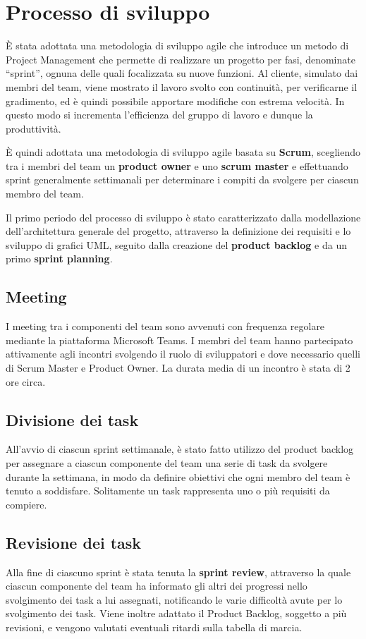 \section{Processo di sviluppo}
È stata adottata una metodologia di sviluppo agile che introduce un metodo di Project Management che permette di realizzare un progetto per fasi, denominate “sprint”, ognuna delle quali focalizzata su nuove funzioni. Al cliente, simulato dai membri del team, viene mostrato il lavoro svolto con continuità, per verificarne il gradimento, ed è quindi possibile apportare modifiche con estrema velocità. In questo modo si incrementa l’efficienza del gruppo di lavoro e dunque la produttività.

È quindi adottata una metodologia di sviluppo agile basata su \textbf{Scrum}, scegliendo tra i membri del team un \textbf{product owner} e uno \textbf{scrum master} e effettuando sprint generalmente settimanali per determinare i compiti da svolgere per ciascun membro del team.

Il primo periodo del processo di sviluppo è stato caratterizzato dalla modellazione dell'architettura generale del progetto, attraverso la definizione dei requisiti e lo sviluppo di grafici UML, seguito dalla creazione del \textbf{product backlog} e da un primo \textbf{sprint planning}.

\subsection{Meeting}
I meeting tra i componenti del team sono avvenuti con frequenza regolare mediante la piattaforma Microsoft Teams. 
I membri del team hanno partecipato attivamente agli incontri svolgendo il ruolo di sviluppatori e dove necessario quelli di Scrum Master e Product Owner. La durata media di un incontro è stata di 2 ore circa.

\subsection{Divisione dei task}
All'avvio di ciascun sprint settimanale, è stato fatto utilizzo del product backlog per assegnare a ciascun componente del team una serie di task da svolgere durante la settimana, in modo da definire obiettivi che ogni membro del team è tenuto a soddisfare. Solitamente un task rappresenta uno o più requisiti da compiere.

\subsection{Revisione dei task}
Alla fine di ciascuno sprint è stata tenuta la \textbf{sprint review}, attraverso la quale ciascun componente del team ha informato gli altri dei progressi nello svolgimento dei task a lui assegnati, notificando le varie difficoltà avute per lo svolgimento dei task.
Viene inoltre adattato il Product Backlog, soggetto a più revisioni, e vengono valutati eventuali ritardi sulla tabella di marcia.

